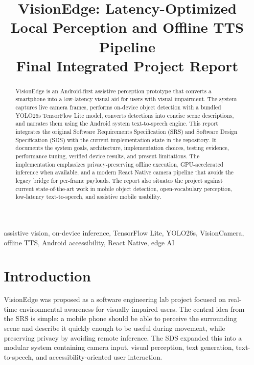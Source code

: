 \documentclass[conference]{IEEEtran}
\title{VisionEdge: Latency-Optimized Local Perception and Offline TTS Pipeline\\
\large Final Integrated Project Report}
\author{
\IEEEauthorblockN{Ayan Gattani (23BCT0059), Madhav Juneja (23BCT0111), Adheesh Garg (23BCT0122)}
\IEEEauthorblockA{
Software Engineering Lab, Winter Semester 2025--26\\
Instructor: Dr. Swarnalatha P\\
VIT\\
\texttt{com.anonymous.visionedge}
}
}
\begin{document}
\maketitle

\begin{abstract}
VisionEdge is an Android-first assistive perception prototype that converts a smartphone into a low-latency visual aid for users with visual impairment. The system captures live camera frames, performs on-device object detection with a bundled YOLO26s TensorFlow Lite model, converts detections into concise scene descriptions, and narrates them using the Android system text-to-speech engine. This report integrates the original Software Requirements Specification (SRS) and Software Design Specification (SDS) with the current implementation state in the repository. It documents the system goals, architecture, implementation choices, testing evidence, performance tuning, verified device results, and present limitations. The implementation emphasizes privacy-preserving offline execution, GPU-accelerated inference when available, and a modern React Native camera pipeline that avoids the legacy bridge for per-frame payloads. The report also situates the project against current state-of-the-art work in mobile object detection, open-vocabulary perception, low-latency text-to-speech, and assistive mobile usability.
\end{abstract}

\begin{IEEEkeywords}
assistive vision, on-device inference, TensorFlow Lite, YOLO26s, VisionCamera, offline TTS, Android accessibility, React Native, edge AI
\end{IEEEkeywords}

\section{Introduction}
VisionEdge was proposed as a software engineering lab project focused on real-time environmental awareness for visually impaired users. The central idea from the SRS is simple: a mobile phone should be able to perceive the surrounding scene and describe it quickly enough to be useful during movement, while preserving privacy by avoiding remote inference. The SDS expanded this into a modular system containing camera input, visual perception, text generation, text-to-speech, and accessibility-oriented user interaction.
\end{document}
